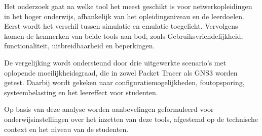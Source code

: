 \vspace{0.3cm}

Het onderzoek gaat na welke tool het meest geschikt is voor netwerkopleidingen in het hoger onderwijs, afhankelijk van het opleidingsniveau en de leerdoelen. Eerst wordt het verschil tussen simulatie en emulatie toegelicht. Vervolgens komen de kenmerken van beide tools aan bod, zoals Gebruiksvriendelijkheid, functionaliteit, uitbreidbaarheid en beperkingen.

\vspace{0.3cm}

De vergelijking wordt ondersteund door drie uitgewerkte scenario’s met oplopende moeilijkheidsgraad, die in zowel Packet Tracer als GNS3 worden getest. Daarbij wordt gekeken naar configuratiemogelijkheden, foutopsporing, systeembelasting en het leereffect voor studenten.

\vspace{0.3cm}

Op basis van deze analyse worden aanbevelingen geformuleerd voor onderwijsinstellingen over het inzetten van deze tools, afgestemd op de technische context en het niveau van de studenten.

